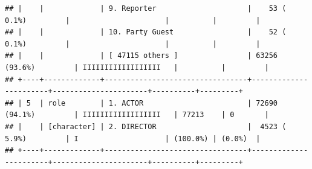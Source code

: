 \documentclass[11pt,preprint]{elsarticle}
\numberwithin{equation}{section}
\numberwithin{figure}{section}
\numberwithin{table}{section}
\begin{document}
\begin{verbatim}
## |    |             | 9. Reporter                     |    53 ( 0.1%)         |                      |          |         |
## |    |             | 10. Party Guest                 |    52 ( 0.1%)         |                      |          |         |
## |    |             | [ 47115 others ]                | 63256 (93.6%)         | IIIIIIIIIIIIIIIIII   |          |         |
## +----+-------------+---------------------------------+-----------------------+----------------------+----------+---------+
## | 5  | role        | 1. ACTOR                        | 72690 (94.1%)         | IIIIIIIIIIIIIIIIII   | 77213    | 0       |
## |    | [character] | 2. DIRECTOR                     |  4523 ( 5.9%)         | I                    | (100.0%) | (0.0%)  |
## +----+-------------+---------------------------------+-----------------------+----------------------+----------+---------+
\end{verbatim}

\begin{Shaded}
\begin{Highlighting}[]
\OtherTok{\textless{}{-}}  \NormalTok{, } \NormalTok{)}
\end{Highlighting}
\end{Shaded}
\end{document}
